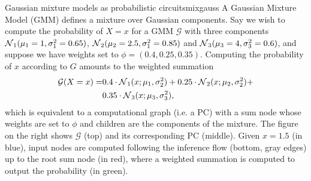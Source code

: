\newcommand\mone{1}%
\newcommand\sone{0.65}%
\newcommand\mtwo{2.5}%
\newcommand\stwo{0.85}%
\newcommand\mthr{4}%
\newcommand\sthr{0.6}%
\begin{example}[sidebyside,lefthand width=0.55\textwidth]{Gaussian mixture models as probabilistic circuits}{mixgauss}
  A Gaussian Mixture Model (GMM) defines a mixture over Gaussian components. Say we wish to compute
  the probability of $X=x$ for a GMM $\mathcal{G}$ with three components
  $\gaussian_1(\mu_1=\mone,\sigma^2_1=\sone)$, $\gaussian_2(\mu_2=\mtwo, \sigma^2_1=\stwo)$ and
  $\gaussian_3(\mu_3=\mthr,\sigma^2_3=\sthr)$, and suppose we have weights set to
  $\phi=(0.4,0.25,0.35)$. Computing the probability of $x$ according to $G$ amounts to the weighted
  summation
  \begin{align*}
    \mathcal{G}(X=x)=&0.4\cdot\operatorname{\mathcal{N}}_1(x;\mu_1,\sigma^2_2)+0.25\cdot\operatorname{\mathcal{N}}_2(x;\mu_2,\sigma^2_2)+\\
                     &0.35\cdot\operatorname{\mathcal{N}}_3(x;\mu_3,\sigma^2_3),
  \end{align*}
  which is equivalent to a computational graph (i.e. a PC) with a sum node whose weights are set to
  $\phi$ and children are the components of the mixture. The figure on the right shows
  $\mathcal{G}$ (top) and its corresponding PC (middle). Given $x=1.5$ (in blue), input nodes are
  computed following the inference flow (bottom, gray edges) up to the root sum node (in red),
  where a weighted summation is computed to output the probability (in green).


\end{example}

